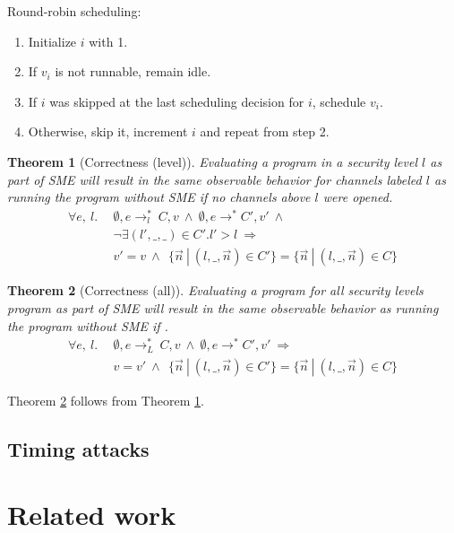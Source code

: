 \documentclass[10pt,preprint]{sigplanconf}
\newtheorem{theorem}{Theorem}
\begin{document}
Round-robin scheduling:

\begin{enumerate}
  \item Initialize $i$ with 1.
  \item If $v_i$ is not runnable, remain idle.
  \item If $i$ was skipped at the last scheduling decision for $i$, schedule $v_i$.
  \item Otherwise, skip it, increment $i$ and repeat from step 2.
\end{enumerate}

\begin{theorem}[Correctness (level)]
  Evaluating a program in a security level $l$ as part of SME will result in the same observable behavior for channels labeled $l$ as running the program without SME if no channels above $l$ were opened.
\begin{align*}
\forall e,~ l.~~&\emptyset, e \rightarrow^{*}_l~C,v ~\wedge~\emptyset,e \rightarrow^{*} C',v'~\wedge  \\
                & \neg \exists {(l',\_,\_) \in C'} . l' > l ~\Rightarrow \\ & v' = v~\wedge~ ~\{ \vec{n} ~|~ (l, \_, \vec{n}) \in C' \} = \{ \vec{n} ~|~ (l, \_, \vec{n}) \in C \}
\end{align*}
\label{th:lvl}
\end{theorem}

\begin{theorem}[Correctness (all)]
  Evaluating a program for all security levels program as part of SME will result in the same observable behavior as running the program without SME if .
\begin{align*}
\forall e,~ l.~~&\emptyset, e \rightarrow^{*}_L~C,v ~\wedge~\emptyset,e \rightarrow^{*} C',v' ~\Rightarrow \\ & v = v'~\wedge~ ~\{ \vec{n} ~|~ (l, \_, \vec{n}) \in C' \} = \{ \vec{n} ~|~ (l, \_, \vec{n}) \in C \}
\end{align*}
\label{th:all}
\end{theorem}

Theorem \ref{th:all} follows from Theorem \ref{th:lvl}.

\subsection{Timing attacks}



\section{Related work}
\end{document}
